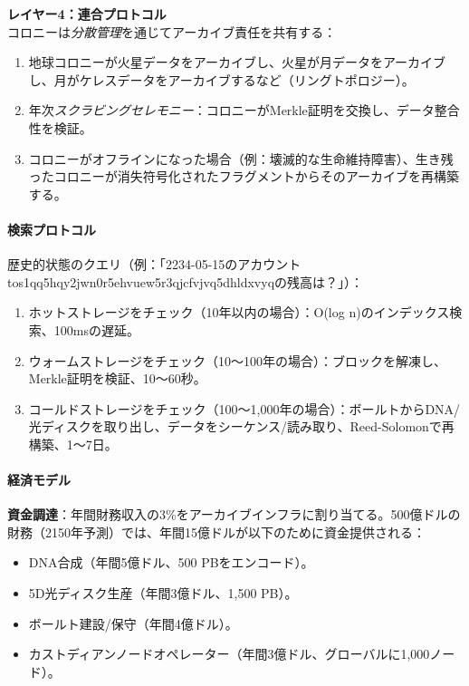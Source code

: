 \documentclass[11pt]{article}
\begin{document}
\textbf{レイヤー4：連合プロトコル}\\
コロニーは\emph{分散管理}を通じてアーカイブ責任を共有する：
\begin{enumerate}[noitemsep]
  \item 地球コロニーが火星データをアーカイブし、火星が月データをアーカイブし、月がケレスデータをアーカイブするなど（リングトポロジー）。
  \item 年次\emph{スクラビングセレモニー}：コロニーがMerkle証明を交換し、データ整合性を検証。
  \item コロニーがオフラインになった場合（例：壊滅的な生命維持障害）、生き残ったコロニーが消失符号化されたフラグメントからそのアーカイブを再構築する。
\end{enumerate}

\paragraph{検索プロトコル}
歴史的状態のクエリ（例：「2234-05-15のアカウントtos1qq5hqy2jwn0r5ehvuew5r3qjcfvjvq5dhldxvyqの残高は？」）：
\begin{enumerate}[noitemsep]
  \item ホットストレージをチェック（10年以内の場合）：O(log n)のインデックス検索、100msの遅延。
  \item ウォームストレージをチェック（10〜100年の場合）：ブロックを解凍し、Merkle証明を検証、10〜60秒。
  \item コールドストレージをチェック（100〜1,000年の場合）：ボールトからDNA/光ディスクを取り出し、データをシーケンス/読み取り、Reed-Solomonで再構築、1〜7日。
\end{enumerate}

\paragraph{経済モデル}
\textbf{資金調達}：年間財務収入の3\%をアーカイブインフラに割り当てる。500億ドルの財務（2150年予測）では、年間15億ドルが以下のために資金提供される：
\begin{itemize}[noitemsep]
  \item DNA合成（年間5億ドル、500 PBをエンコード）。
  \item 5D光ディスク生産（年間3億ドル、1,500 PB）。
  \item ボールト建設/保守（年間4億ドル）。
  \item カストディアンノードオペレーター（年間3億ドル、グローバルに1,000ノード）。
\end{itemize}
\end{document}
